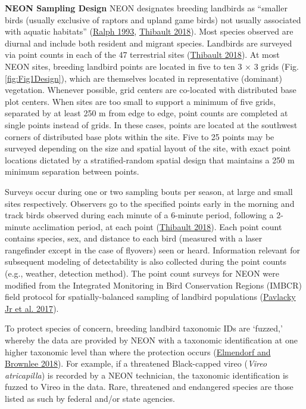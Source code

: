 \documentclass[
  12pt,
]{article}
\begin{document}
\textbf{NEON Sampling Design} NEON designates breeding landbirds as ``smaller birds (usually exclusive of raptors and upland game birds) not usually associated with aquatic habitats'' (\protect\hyperlink{ref-ralph1993handbook}{Ralph 1993}, \protect\hyperlink{ref-thibault2018TOS}{Thibault 2018}). Most species observed are diurnal and include both resident and migrant species. Landbirds are surveyed via point counts in each of the 47 terrestrial sites (\protect\hyperlink{ref-thibault2018TOS}{Thibault 2018}). At most NEON sites, breeding landbird points are located in five to ten 3 \(\times\) 3 grids (Fig. \ref{fig:Fig1Design}), which are themselves located in representative (dominant) vegetation. Whenever possible, grid centers are co-located with distributed base plot centers. When sites are too small to support a minimum of five grids, separated by at least 250 m from edge to edge, point counts are completed at single points instead of grids. In these cases, points are located at the southwest corners of distributed base plots within the site. Five to 25 points may be surveyed depending on the size and spatial layout of the site, with exact point locations dictated by a stratified-random spatial design that maintains a 250 m minimum separation between points.

Surveys occur during one or two sampling bouts per season, at large and small sites respectively. Observers go to the specified points early in the morning and track birds observed during each minute of a 6-minute period, following a 2-minute acclimation period, at each point (\protect\hyperlink{ref-thibault2018TOS}{Thibault 2018}). Each point count contains species, sex, and distance to each bird (measured with a laser rangefinder except in the case of flyovers) seen or heard. Information relevant for subsequent modeling of detectability is also collected during the point counts (e.g., weather, detection method). The point count surveys for NEON were modified from the Integrated Monitoring in Bird Conservation Regions (IMBCR) field protocol for spatially-balanced sampling of landbird populations (\protect\hyperlink{ref-pavlacky2017statistically}{Pavlacky Jr et al. 2017}).

To protect species of concern, breeding landbird taxonomic IDs are `fuzzed,' whereby the data are provided by NEON with a taxonomic identification at one higher taxonomic level than where the protection occurs (\protect\hyperlink{ref-Elmendorf2018}{Elmendorf and Brownlee 2018}). For example, if a threatened Black-capped vireo (\emph{Vireo atricapilla}) is recorded by a NEON technician, the taxonomic identification is fuzzed to Vireo in the data. Rare, threatened and endangered species are those listed as such by federal and/or state agencies.
\end{document}
